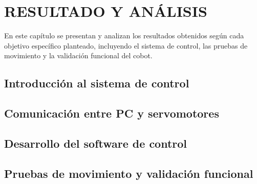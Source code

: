 
\chapter{RESULTADO Y ANÁLISIS}

En este capítulo se presentan y analizan los resultados obtenidos según cada objetivo específico planteado, incluyendo el sistema de control, las pruebas de movimiento y la validación funcional del cobot.

\section{Introducción al sistema de control}


\section{Comunicación entre PC y servomotores}


\section{Desarrollo del software de control}


\section{Pruebas de movimiento y validación funcional}

